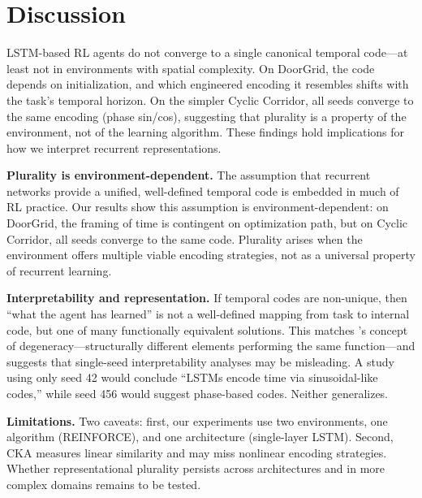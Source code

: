 \documentclass{article}
\begin{document}
\section{Discussion}

LSTM-based RL agents do not converge to a single canonical temporal code---at least not in environments with spatial complexity.
On DoorGrid, the code depends on initialization, and which engineered encoding it resembles shifts with the task's temporal horizon.
On the simpler Cyclic Corridor, all seeds converge to the same encoding (phase sin/cos), suggesting that plurality is a property of the environment, not of the learning algorithm.
These findings hold implications for how we interpret recurrent representations.

\textbf{Plurality is environment-dependent.}
The assumption that recurrent networks provide a unified, well-defined temporal code is embedded in much of RL practice.
Our results show this assumption is environment-dependent: on DoorGrid, the framing of time is contingent on optimization path, but on Cyclic Corridor, all seeds converge to the same code.
Plurality arises when the environment offers multiple viable encoding strategies, not as a universal property of recurrent learning.

\textbf{Interpretability and representation.}
If temporal codes are non-unique, then ``what the agent has learned'' is not a well-defined mapping from task to internal code, but one of many functionally equivalent solutions.
This matches \citet{edelman2001degeneracy}'s concept of degeneracy---structurally different elements performing the same function---and suggests that single-seed interpretability analyses may be misleading.
A study using only seed 42 would conclude ``LSTMs encode time via sinusoidal-like codes,'' while seed 456 would suggest phase-based codes.
Neither generalizes.

\textbf{Limitations.}
Two caveats: first, our experiments use two environments, one algorithm (REINFORCE), and one architecture (single-layer LSTM).
Second, CKA measures linear similarity and may miss nonlinear encoding strategies.
Whether representational plurality persists across architectures and in more complex domains remains to be tested.



\end{document}

